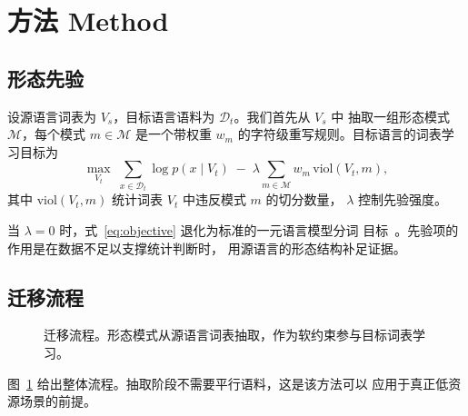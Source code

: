 \section{方法 Method}
\label{sec:method}

\subsection{形态先验}

设源语言词表为 $V_s$，目标语言语料为 $\mathcal{D}_t$。我们首先从 $V_s$ 中
抽取一组形态模式 $\mathcal{M}$，每个模式 $m \in \mathcal{M}$ 是一个带权重
$w_m$ 的字符级重写规则。目标语言的词表学习目标为
\begin{equation}
  \label{eq:objective}
  \max_{V_t} \; \sum_{x \in \mathcal{D}_t} \log p(x \mid V_t)
  \; - \; \lambda \sum_{m \in \mathcal{M}} w_m \, \mathrm{viol}(V_t, m),
\end{equation}
其中 $\mathrm{viol}(V_t, m)$ 统计词表 $V_t$ 中违反模式 $m$ 的切分数量，
$\lambda$ 控制先验强度。

当 $\lambda = 0$ 时，式~\eqref{eq:objective} 退化为标准的一元语言模型分词
目标~\cite{kudo2018subword}。先验项的作用是在数据不足以支撑统计判断时，
用源语言的形态结构补足证据。

\subsection{迁移流程}

\begin{figure}[t]
  \centering
  \caption{迁移流程。形态模式从源语言词表抽取，作为软约束参与目标词表学习。}
  \label{fig:pipeline}
\end{figure}

图~\ref{fig:pipeline} 给出整体流程。抽取阶段不需要平行语料，这是该方法可以
应用于真正低资源场景的前提。
